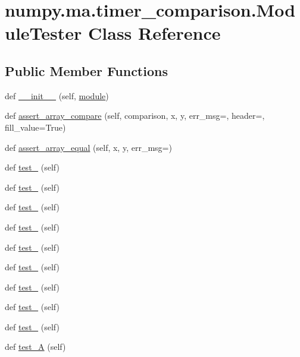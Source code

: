 \hypertarget{classnumpy_1_1ma_1_1timer__comparison_1_1ModuleTester}{}\section{numpy.\+ma.\+timer\+\_\+comparison.\+Module\+Tester Class Reference}
\label{classnumpy_1_1ma_1_1timer__comparison_1_1ModuleTester}
\subsection*{Public Member Functions}
\begin{DoxyCompactItemize}
\item 
def \hyperlink{classnumpy_1_1ma_1_1timer__comparison_1_1ModuleTester_a37fe81b0cf7ec2731a3a4825d987d6c3}{\+\_\+\+\_\+init\+\_\+\+\_\+} (self, \hyperlink{classnumpy_1_1ma_1_1timer__comparison_1_1ModuleTester_a966eb36b13d136cce768aa7bfc19abba}{module})
\item 
def \hyperlink{classnumpy_1_1ma_1_1timer__comparison_1_1ModuleTester_a8589445672e13c9f2916888ec874eb22}{assert\+\_\+array\+\_\+compare} (self, comparison, x, y, err\+\_\+msg=\textquotesingle{}\textquotesingle{}, header=\textquotesingle{}\textquotesingle{}, fill\+\_\+value=True)
\item 
def \hyperlink{classnumpy_1_1ma_1_1timer__comparison_1_1ModuleTester_a64bc88870cb372c5e929e24cfec6753e}{assert\+\_\+array\+\_\+equal} (self, x, y, err\+\_\+msg=\textquotesingle{}\textquotesingle{})
\item 
def \hyperlink{classnumpy_1_1ma_1_1timer__comparison_1_1ModuleTester_a29d71f0cb5887b6c95633829d99f2aa0}{test\+\_} (self)
\item 
def \hyperlink{classnumpy_1_1ma_1_1timer__comparison_1_1ModuleTester_a78cf9655726ffec367c7c085e20c796c}{test\+\_} (self)
\item 
def \hyperlink{classnumpy_1_1ma_1_1timer__comparison_1_1ModuleTester_a2e6799c98e3af3a9338682752939d4b1}{test\+\_} (self)
\item 
def \hyperlink{classnumpy_1_1ma_1_1timer__comparison_1_1ModuleTester_a7fc27f692a9a557a649fc4c26710ec82}{test\+\_} (self)
\item 
def \hyperlink{classnumpy_1_1ma_1_1timer__comparison_1_1ModuleTester_a40643ff7df4bf5f10b6d05f803abf4ae}{test\+\_} (self)
\item 
def \hyperlink{classnumpy_1_1ma_1_1timer__comparison_1_1ModuleTester_a3828ab2a2943b6468afe038d3b4d35ff}{test\+\_} (self)
\item 
def \hyperlink{classnumpy_1_1ma_1_1timer__comparison_1_1ModuleTester_a87479b712528d75d00dc2be438ae57ac}{test\+\_} (self)
\item 
def \hyperlink{classnumpy_1_1ma_1_1timer__comparison_1_1ModuleTester_a1dbe48306c6cde790d04cc889175d943}{test\+\_} (self)
\item 
def \hyperlink{classnumpy_1_1ma_1_1timer__comparison_1_1ModuleTester_acfdb178339c551d48ae660e0dd02c675}{test\+\_} (self)
\item 
def \hyperlink{classnumpy_1_1ma_1_1timer__comparison_1_1ModuleTester_a38cdb5859f64249cdd08937d3d8db9a4}{test\+\_\+A} (self)
\end{DoxyCompactItemize}
